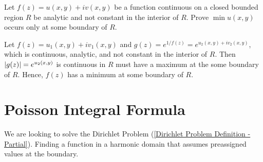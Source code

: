\documentclass[12pt, english]{book}
\makeatletter
\renewenvironment{proof}[1][\proofname]{\par
	\pushQED{\qed}%
	\normalfont \topsep6\p@\@plus6\p@\relax
	\list{}{%
		\settowidth{\leftmargin}{\itshape\proofname:\hskip\labelsep}%
		\setlength{\labelwidth}{0pt}%
		\setlength{\itemindent}{-\leftmargin}%
	}%
	\item[\hskip\labelsep\itshape#1\@addpunct{:}]\ignorespaces
	}{ \popQED\endlist\@endpefalse}
\makeatother
\begin{document}
	\begin{example}
		\label{Max and Min of Harmonic Real-Valued function only occurs at the boundary of closed bounded region Example - Complex}
		Let \(f(z) = u(x,y) + iv(x,y)\) be a function continuous on a closed bounded region \(R\) be analytic and not constant in the interior of \(R\). Prove \(\min u(x,y)\) occurs only at some boundary of \(R\).
		\begin{proof}
			{\color{Grey}
			Let \(f(z) = u_1(x,y) + iv_1(x,y)\) and \(g(z) = e^{1/f(z)} = e^{u_2(x,y) + iv_2(x,y)}\), which is continuous, analytic, and not constant in the interior of \(R\). Then \(\abs{g(z)} = e^{u_2(x,y)}\) is continuous in \(R\) must have a maximum at the some boundary of \(R\). Hence, \(f(z)\) has a minimum at some boundary of \(R\).
			}
		\end{proof}
	\end{example}

	\section{Poisson Integral Formula} \label{Poisson Integral Formula - Complex}
	
	We are looking to solve the Dirichlet Problem (\cref{Dirichlet Problem Definition - Partial}). Finding a function in a harmonic domain  that assumes preassigned values at the boundary.
	
\end{document}
